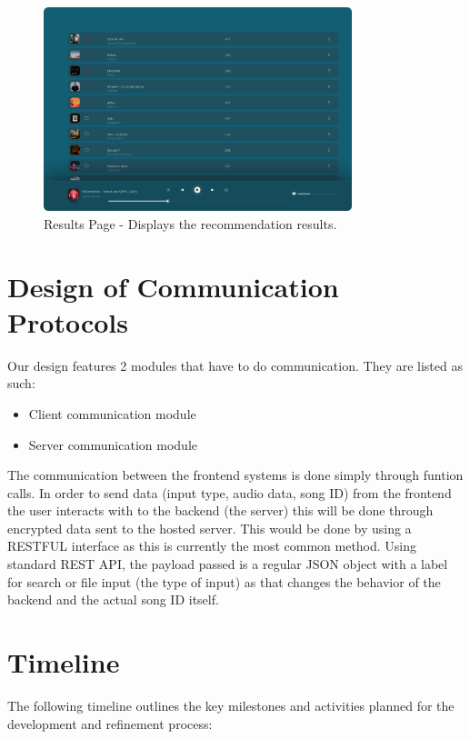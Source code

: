 \documentclass[12pt, titlepage]{article}
\begin{document}
\begin{figure}[h!]
  \centering
  \includegraphics[width=0.8\textwidth]{UI_Images/Results_Page.png}
  \caption{Results Page - Displays the recommendation results.}
  \label{fig:results_page}
\end{figure}


\section{Design of Communication Protocols}
Our design features 2 modules that have to do communication. They are listed as such: 
\begin{itemize}
  \item Client communication module
  \item Server communication module
\end{itemize}
The communication between the frontend systems is done simply through funtion calls. In order to send data (input type, audio data, song ID) from the frontend the user 
interacts with to the backend (the server) this will be done through encrypted data sent to the hosted server. This would be done by using
a RESTFUL interface as this is currently the most common method. Using standard REST API, the payload passed is a regular JSON object with 
a label for search or file input (the type of input) as that changes the behavior of the backend and the actual song ID itself. 

\section{Timeline}

The following timeline outlines the key milestones and activities planned for the development and refinement process:
\end{document}
